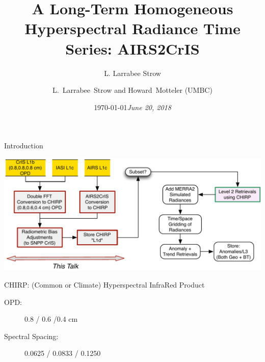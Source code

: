 \documentclass[10pt,t]{beamer}
\author{L. Larrabee Strow}
\date{\today}
\title{\large A Long-Term Homogeneous Hyperspectral Radiance Time Series: AIRS2CrIS}
\date{\textit{\footnotesize June 20, 2018}}
\author{L.~Larrabee~Strow and Howard~Motteler (UMBC)}
\begin{document}
\maketitle
{}

\begin{frame}[label={sec:org52d7519}]{Introduction}
\vspace{-0.2in}
\begin{center}
\includegraphics[width=1.0\linewidth]{./Figs/Pdf/airs2cris_stm_talk1_landscape.pdf}
\end{center}

\begin{block}{CHIRP: (Common or Climate) Hyperspectral InfraRed Product}
\begin{description}
\item[{OPD:}] 0.8 / 0.6 /0.4 cm
\item[{Spectral Spacing:}] 0.0625 / 0.0833 / 0.1250 \wn
\end{description}
\end{block}
\end{frame}
\end{document}
